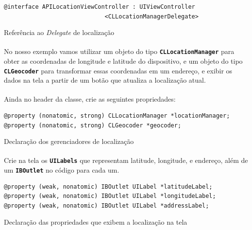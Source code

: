 \documentclass[a4paper,12pt,brazil,doubleside]{book}
\begin{document}
\begin{singlespace}
\begin{listing}[H]
\begin{verbatim}
@interface APILocationViewController : UIViewController
                             <CLLocationManagerDelegate>
\end{verbatim}
\caption{Referência ao \emph{Delegate} de localização}
\end{listing}

\paragraph{}No nosso exemplo vamos utilizar um objeto do tipo \texttt{\textbf{CLLocationManager}} para obter as coordenadas de longitude e latitude do dispositivo, e um objeto do tipo \texttt{\textbf{CLGeocoder}} para transformar essas coordenadas em um endereço, e exibir os dados na tela a partir de um botão que atualiza a localização atual.
\paragraph{}Ainda no header da classe, crie as seguintes propriedades:

\begin{listing}[H]
\begin{verbatim}
@property (nonatomic, strong) CLLocationManager *locationManager;
@property (nonatomic, strong) CLGeocoder *geocoder;
\end{verbatim}
\caption{Declaração dos gerenciadores de localização}
\end{listing}

\paragraph{}Crie na tela os \texttt{\textbf{UILabels}} que representam latitude, longitude, e endereço, além de um \texttt{\textbf{IBOutlet}} no código para cada um.

\begin{listing}[H]
\begin{verbatim}
@property (weak, nonatomic) IBOutlet UILabel *latitudeLabel;
@property (weak, nonatomic) IBOutlet UILabel *longitudeLabel;
@property (weak, nonatomic) IBOutlet UILabel *addressLabel;
\end{verbatim}
\caption{Declaração das propriedades que exibem a localização na tela}
\end{listing}


\end{singlespace}
\end{document}
